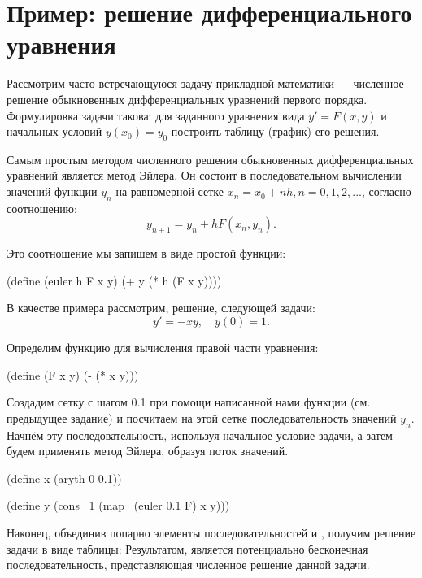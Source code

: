 \section[4]{Пример: решение дифференциального уравнения}%
Рассмотрим часто встречающуюся задачу прикладной математики --- численное решение обыкновенных дифференциальных уравнений первого порядка. Формулировка задачи такова: для заданного уравнения вида $y'=F(x,y)$ и начальных условий $y(x_0)=y_0$ построить таблицу (график) его решения.

Самым простым методом численного решения обыкновенных дифференциальных уравнений является метод Эйлера. Он состоит в последовательном вычислении значений функции $y_n$ на равномерной сетке $x_n = x_0 + n h, n = 0,1,2,...$, согласно соотношению:
$$y_{n+1} = y_n + h F(x_n,y_n).$$

Это соотношение мы запишем в виде простой функции:
\begin{Definition}[emph={f,x,y,h}]
(define (euler h F x y)
  (+ y (* h (F x y))))
\end{Definition}

В качестве примера рассмотрим, решение, следующей задачи:
$$\label{ode}y'=-x y,\quad y(0)=1.$$

Определим функцию для вычисления правой части уравнения:
\begin{SchemeCode}
(define (F x y) (- (* x y)))
\end{SchemeCode}
\noindent%
Создадим сетку с шагом 0.1 при помощи написанной нами функции  (см. предыдущее задание) и посчитаем на этой сетке последовательность значений $y_n$. Начнём эту последовательность, используя начальное условие задачи, а затем будем применять метод Эйлера, образуя поток значений.
\vspace{-\bigskipamount}
\begin{SchemeCode}
(define x (aryth 0 0.1))

(define y (cons~ 1 (map~ (euler 0.1 F) x y)))
\end{SchemeCode}
\noindent%
Наконец, объединив попарно элементы последовательностей  и , получим решение задачи в виде таблицы:
\vspace{-\medskipamount}
\vspace{-\medskipamount}
\vspace{-\medskipamount}
\vspace{-\medskipamount}
\vspace{-\medskipamount}
Результатом, является потенциально бесконечная последовательность, представляющая численное решение данной задачи.

